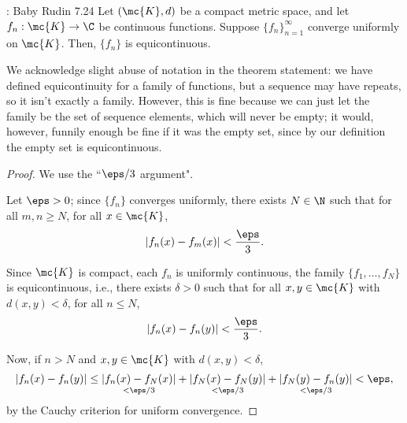 \begin{ntheorem}{: Baby Rudin 7.24}
	Let \((\mc{K},d)\) be a compact metric space, and let \(f_n:\mc{K}\to\C\) be continuous functions. Suppose \(\{f_n\}_{n=1}^{\infty}\) converge uniformly on \(\mc{K}\). Then, \(\{f_n\}\) is equicontinuous.
\end{ntheorem}
\begin{note}[Notation]
	We acknowledge slight abuse of notation in the theorem statement: we have defined equicontinuity for a family of functions, but a sequence may have repeats, so it isn't exactly a family. However, this is fine because we can just let the family be the set of sequence elements, which will never be empty; it would, however, funnily enough be fine if it was the empty set, since by our definition the empty set is equicontinuous.
\end{note}
\begin{proof}
	We use the ``\(\eps/3\) argument".
	
	\medskip
	
	Let \(\eps>0\); since \(\{f_n\}\) converges uniformly, there exists \(N\in\N\) such that for all \(m,n\geq N\), for all \(x\in\mc{K}\),
	\begin{equation*}
		|f_n(x)-f_m(x)|<\displaystyle\frac{\eps}{3}.
	\end{equation*}
	
	\medskip
	
	Since \(\mc{K}\) is compact, each \(f_n\) is uniformly continuous, the family \(\{f_1,\dots,f_N\}\) is equicontinuous, i.e., there exists \(\delta>0\) such that for all \(x,y\in\mc{K}\) with \(d(x,y)<\delta\), for all \(n\leq N\),
	\begin{equation*}
		|f_n(x)-f_n(y)|<\displaystyle\frac{\eps}{3}.
	\end{equation*}
	
	\medskip
	
	Now, if \(n>N\) and \(x,y\in\mc{K}\) with \(d(x,y)<\delta\), 
	\begin{equation*}
		|f_n(x)-f_n(y)|\leq \underset{<\eps/3}{|f_n(x)-f_N(x)|}+\underset{<\eps/3}{|f_N(x)-f_N(y)|}+\underset{<\eps/3}{|f_N(y)-f_n(y)|}<\eps,
	\end{equation*}
	by the Cauchy criterion for uniform convergence.
\end{proof}

